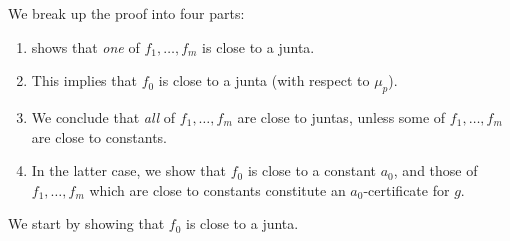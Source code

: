 \documentclass{article}
\theoremstyle{definition}
\theoremstyle{remark}
\begin{document}
We break up the proof into four parts:
\begin{enumerate}
    \item {} shows that \emph{one} of $f_1,\ldots,f_m$ is close to a junta.
    \item This implies that $f_0$ is close to a junta (with respect to $\mu_p$).
    \item We conclude that \emph{all} of $f_1,\ldots,f_m$ are close to juntas, unless some of $f_1,\ldots,f_m$ are close to constants.
    \item In the latter case, we show that $f_0$ is close to a constant $a_0$, and those of $f_1,\ldots,f_m$ which are close to constants constitute an $a_0$-certificate for $g$.
\end{enumerate}

We start by showing that $f_0$ is close to a junta.
\end{document}
